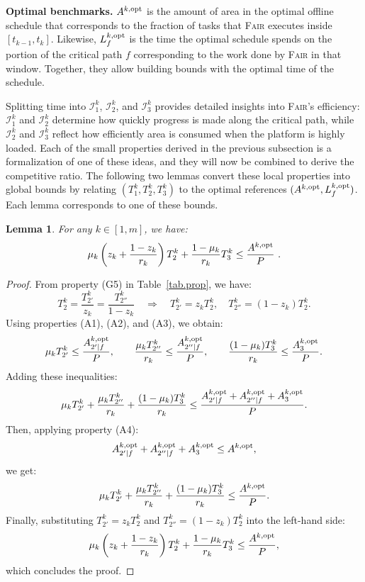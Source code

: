 \documentclass{article}
\newtheorem{lemma}{Lemma}
\newcommand\fair{\textsc{Fair}\xspace}
\newcommand\rratio{r\xspace}
\newcommand\opt{\textnormal{opt}\xspace}
\begin{document}
\smallskip\noindent
\textbf{Optimal benchmarks.}  
$A^{k,\opt}$ is the amount of area in the optimal
offline schedule that corresponds to the fraction of tasks that \fair executes
inside $[t_{k-1},t_k]$.  Likewise, $L_f^{k,\opt}$ is the time the optimal schedule
spends on the portion of the critical path $f$ corresponding to the work done
by \fair in that window. Together, they allow building bounds with the optimal time of the schedule.

\medskip
Splitting time into $\mathcal{I}_1^k$, $\mathcal{I}_2^k$, and $\mathcal{I}_3^k$ provides detailed insights into \fair ’s efficiency: \(\mathcal{I}_1^k\) and \(\mathcal{I}_2^k\) determine how quickly progress is made along the critical path, while $\mathcal{I}_2^k$ and \(\mathcal{I}_3^k\) reflect how efficiently area is consumed when the platform is highly loaded. Each of the small properties derived in the previous subsection is a formalization of one of these ideas, and they will now be combined to derive the competitive ratio. The following two lemmas convert these local properties into global bounds by relating $(T_1^k, T_2^k, T_3^k)$ to the optimal references $(A^{k,\opt}, L_f^{k,\opt})$. Each lemma corresponds to one of these bounds.



\begin{lemma}\label{lem.area}
For any $k \in [1,m]$, we have:
\begin{equation}\label{Area}
\mu_k\left( z_k + \frac{1 - z_k}{\rratio_k} \right) T_2^k + \frac{1 - \mu_k}{\rratio_k} T_3^k \le \frac{A^{k,\opt}}{P} \ .
\end{equation}
\end{lemma}

\begin{proof}
From property (G5) in Table~\ref{tab.prop}, we have:
\[
T_2^k = \frac{T_{2'}^k}{z_k} = \frac{T_{2''}^k}{1 - z_k} \quad \Rightarrow \quad T_{2'}^k = z_k T_2^k, \quad T_{2''}^k = (1 - z_k) T_2^k.
\]
Using properties (A1), (A2), and (A3), we obtain:
\[
\mu_k T_{2'}^k \le \frac{A_{2'|f}^{k,\opt}}{P}, \qquad
\frac{\mu_k T_{2''}^k}{\rratio_k} \le \frac{A_{2''|f}^{k,\opt}}{P}, \qquad
\frac{(1 - \mu_k) T_3^k}{\rratio_k} \le \frac{A_3^{k,\opt}}{P}.
\]
Adding these inequalities:
\[
\mu_k T_{2'}^k + \frac{\mu_k T_{2''}^k}{\rratio_k} + \frac{(1 - \mu_k) T_3^k}{\rratio_k}
\le \frac{A_{2'|f}^{k,\opt} + A_{2''|f}^{k,\opt} + A_3^{k,\opt}}{P}.
\]
Then, applying property (A4):
\[
A_{2'|f}^{k,\opt} + A_{2''|f}^{k,\opt} + A_3^{k,\opt} \le A^{k,\opt},
\]
we get:
\[
\mu_k T_{2'}^k + \frac{\mu_k T_{2''}^k}{\rratio_k} + \frac{(1 - \mu_k) T_3^k}{\rratio_k}
\le \frac{A^{k,\opt}}{P}.
\]
Finally, substituting \(T_{2'}^k = z_k T_2^k\) and \(T_{2''}^k = (1 - z_k) T_2^k\) into the left-hand side:
\[
\mu_k \left( z_k + \frac{1 - z_k}{\rratio_k} \right) T_2^k + \frac{1 - \mu_k}{\rratio_k} T_3^k \le \frac{A^{k,\opt}}{P},
\]
which concludes the proof.
\end{proof}
\end{document}
